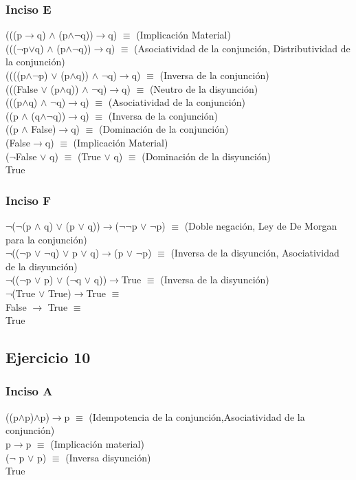 		\subsubsection{Inciso E}
		(((p$\rightarrow$q) $\wedge$ (p$\wedge$$\neg$q))$\rightarrow$q) $\equiv$ (Implicación Material)\\
		((($\neg$p$\vee$q) $\wedge$ (p$\wedge$$\neg$q))$\rightarrow$q) $\equiv$ (Asociatividad de la conjunción, Distributividad de la conjunción)\\
		((((p$\wedge$$\neg$p) $\vee$ (p$\wedge$q)) $\wedge$ $\neg$q)$\rightarrow$q) $\equiv$ (Inversa de la conjunción)\\
		(((False $\vee$ (p$\wedge$q)) $\wedge$ $\neg$q)$\rightarrow$q) $\equiv$ (Neutro de la disyunción)\\
		(((p$\wedge$q) $\wedge$ $\neg$q)$\rightarrow$q) $\equiv$ (Asociatividad de la conjunción)\\
		((p $\wedge$ (q$\wedge$$\neg$q))$\rightarrow$q) $\equiv$ (Inversa de la conjunción)\\
		((p $\wedge$ False)$\rightarrow$q) $\equiv$ (Dominación de la conjunción)\\
		(False$\rightarrow$q) $\equiv$ (Implicación Material)\\
		($\neg$False $\vee$ q) $\equiv$ (True $\vee$ q) $\equiv$ (Dominación de la disyunción)\\
		True
		
		\subsubsection{Inciso F}
		$\neg$($\neg$(p $\wedge$ q) $\vee$ (p $\vee$ q))$\rightarrow$($\neg$$\neg$p $\vee$ $\neg$p) $\equiv$ (Doble negación, Ley de De Morgan para la conjunción)\\
		$\neg$(($\neg$p $\vee$ $\neg$q) $\vee$ p $\vee$ q)$\rightarrow$(p $\vee$ $\neg$p) $\equiv$ (Inversa de la disyunción, Asociatividad de la disyunción)\\
		$\neg$(($\neg$p $\vee$ p) $\vee$ ($\neg$q $\vee$ q))$\rightarrow$True $\equiv$ (Inversa de la disyunción)\\
		$\neg$(True $\vee$ True)$\rightarrow$True $\equiv$\\
		False $\rightarrow$ True $\equiv$\\
		True
	\subsection{Ejercicio 10}
		\subsubsection{Inciso A}
		((p$\wedge$p)$\wedge$p)$\rightarrow$p $\equiv$ (Idempotencia de la conjunción,Asociatividad de la conjunción)\\
		p$\rightarrow$p $\equiv$ (Implicación material)\\
		($\neg$ p $\vee$ p) $\equiv$ (Inversa disyunción)\\
		True

